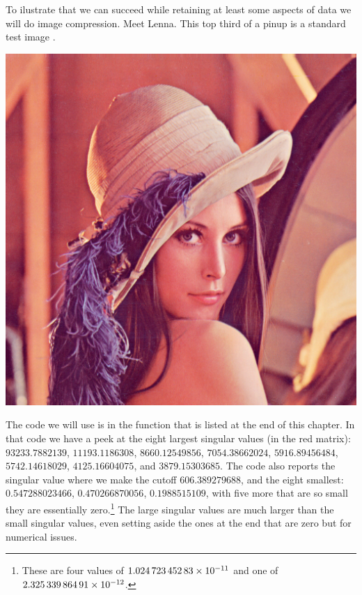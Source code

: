 To ilustrate that we can succeed while retaining at least some aspects of data
we will do image compression.
Meet Lenna.
This top third of a pinup is a standard test image
\cite{wiki:Lenna}.
\begin{center}
  \includegraphics[width=.95\textwidth]{Lenna.png} %
\end{center}

The code we will use is in the  function 
that is listed at the end of this chapter.
In that code we have a peek at the eight largest singular
values (in the red matrix):
  $93233.7882139$, 
  $11193.1186308$, 
  $8660.12549856$, 
  $7054.38662024$, 
  $5916.89456484$, 
  $5742.14618029$, 
  $4125.16604075$, and
  $3879.15303685$.
The code also reports 
the singular value where we make the cutoff $606.389279688$,
and the eight smallest:
  $0.547288023466$, 
  $0.470266870056$, 
  $0.1988515109$, 
with five more that are so small they are essentially 
zero.\footnote{These are four values of 
$1.024\,723\,452\,83\protect\times 10^{-11}$
and one of $2.325\,339\,864\,91\protect\times 10^{-12}$.}
The large singular values are much larger than the small singular values,
even setting aside the ones at the end
that are zero but for numerical issues.

